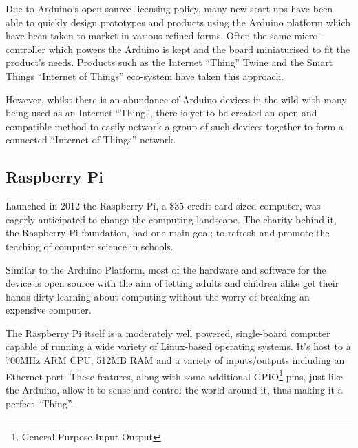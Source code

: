 Due to Arduino's open source licensing policy, many new start-ups have been able to quickly design prototypes and products using the Arduino platform which have been taken to market in various refined forms. Often the same micro-controller which powers the Arduino is kept and the board miniaturised to fit the product's needs. Products such as the Internet ``Thing'' Twine\cite{Twine} and the Smart Things ``Internet of Things'' eco-system have taken this approach\cite{SmartThings}.

However, whilst there is an abundance of Arduino devices in the wild with many being used as an Internet ``Thing'', there is yet to be created an open and compatible method to easily network a group of such devices together to form a connected ``Internet of Things'' network.

\newpage
\subsection{Raspberry Pi} %
\label{sub:raspberry_pi}
Launched in 2012 the Raspberry Pi, a \$35 credit card sized computer, was eagerly anticipated to change the computing landscape. The charity behind it, the Raspberry Pi foundation, had one main goal; to refresh and promote the teaching of computer science in schools.

Similar to the Arduino Platform, most of the hardware and software for the device is open source with the aim of letting adults and children alike get their hands dirty learning about computing without the worry of breaking an expensive computer.

The Raspberry Pi itself is a moderately well powered, single-board computer capable of running a wide variety of Linux-based operating systems. It's host to a 700MHz ARM CPU, 512MB RAM and a variety of inputs/outputs including an Ethernet port. These features, along with some additional GPIO\footnote{General Purpose Input Output} pins, just like the Arduino, allow it to sense and control the world around it, thus making it a perfect ``Thing''.

